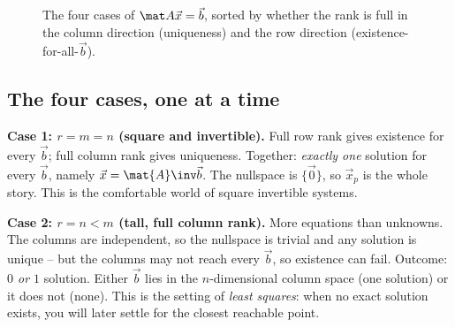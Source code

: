 \begin{figure}[H]
\centering
{}
\caption{The four cases of $\mat A\vec x=\vec b$, sorted by whether the rank is full in the
column direction (uniqueness) and the row direction (existence-for-all-$\vec b$).}
\label{ch13:fourcases}
\end{figure}

\subsection{The four cases, one at a time}

\textbf{Case 1: $r=m=n$ (square and invertible).} Full row rank gives existence for every
$\vec{b}$; full column rank gives uniqueness. Together: \emph{exactly one} solution for
every $\vec{b}$, namely $\vec{x}=\mat{A}\inv\vec{b}$. The nullspace is $\{\vec 0\}$, so
$\vec{x}_p$ is the whole story. This is the comfortable world of square invertible systems.

\textbf{Case 2: $r=n<m$ (tall, full column rank).} More equations than unknowns. The
columns are independent, so the nullspace is trivial and any solution is unique -- but the
columns may not reach every $\vec b$, so existence can fail. Outcome: \emph{$0$ or $1$}
solution. Either $\vec{b}$ lies in the $n$-dimensional column space (one solution) or it
does not (none). This is the setting of \emph{least squares}: when no exact solution
exists, you will later settle for the closest reachable point.

